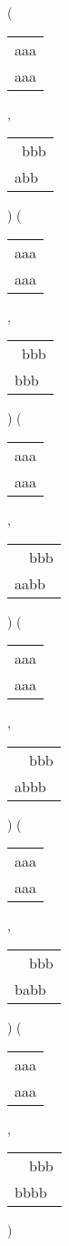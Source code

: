  ( 
\begin{tabular}{|l|} \hline
aaa \\
aaa \\
\hline
\end{tabular} 
 , 
\begin{tabular}{|l|} \hline
\ bbb \\
abb\  \\
\hline
\end{tabular} 
) 
 ( 
\begin{tabular}{|l|} \hline
aaa \\
aaa \\
\hline
\end{tabular} 
 , 
\begin{tabular}{|l|} \hline
\ bbb \\
bbb\  \\
\hline
\end{tabular} 
) 
 ( 
\begin{tabular}{|l|} \hline
aaa \\
aaa \\
\hline
\end{tabular} 
 , 
\begin{tabular}{|l|} \hline
\ \ bbb \\
aabb\  \\
\hline
\end{tabular} 
) 
 ( 
\begin{tabular}{|l|} \hline
aaa \\
aaa \\
\hline
\end{tabular} 
 , 
\begin{tabular}{|l|} \hline
\ \ bbb \\
abbb\  \\
\hline
\end{tabular} 
) 
 ( 
\begin{tabular}{|l|} \hline
aaa \\
aaa \\
\hline
\end{tabular} 
 , 
\begin{tabular}{|l|} \hline
\ \ bbb \\
babb\  \\
\hline
\end{tabular} 
) 
 ( 
\begin{tabular}{|l|} \hline
aaa \\
aaa \\
\hline
\end{tabular} 
 , 
\begin{tabular}{|l|} \hline
\ \ bbb \\
bbbb\  \\
\hline
\end{tabular} 
) 
